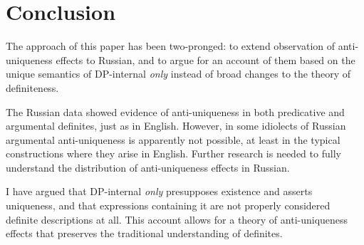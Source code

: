 \section{Conclusion \label{sec:conclusion}}
The approach of this paper has been two-pronged: to extend  observation of anti-uniqueness effects to Russian, and to argue for an account of them based on the unique semantics of DP-internal \textit{only} instead of broad changes to the theory of definiteness.

The Russian data showed evidence of anti-uniqueness in both predicative and argumental definites, just as in English. However, in some idiolects of Russian argumental anti-uniqueness is apparently not possible, at least in the typical constructions where they arise in English. Further research is needed to fully understand the distribution of anti-uniqueness effects in Russian.

I have argued that DP-internal \textit{only} presupposes existence and asserts uniqueness, and that expressions containing it are not properly considered definite descriptions at all. This account allows for a theory of anti-uniqueness effects that preserves the traditional understanding of definites.